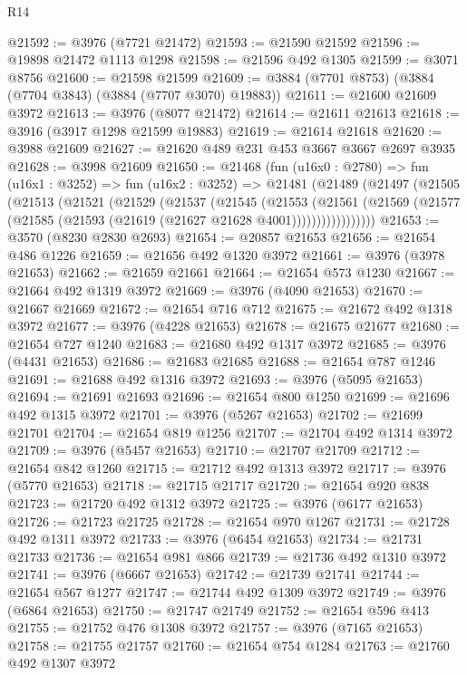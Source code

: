 \begin{lexlean}{R14}
\begin{coremodule}
@21592 := @3976 (@7721 @21472)
@21593 := @21590 @21592
@21596 := @19898 @21472 @1113 @1298
@21598 := @21596 @492 @1305
@21599 := @3071 @8756
@21600 := @21598 @21599
@21609 := @3884 (@7701 @8753) (@3884 (@7704 @3843) (@3884 (@7707 @3070) @19883))
@21611 := @21600 @21609 @3972
@21613 := @3976 (@8077 @21472)
@21614 := @21611 @21613
@21618 := @3916 (@3917 @1298 @21599 @19883)
@21619 := @21614 @21618
@21620 := @3988 @21609
@21627 := @21620 @489 @231 @453 @3667 @3667 @2697 @3935
@21628 := @3998 @21609
@21650 := @21468
    (fun (u16x0 : @2780) =>
    fun (u16x1 : @3252) =>
    fun (u16x2 : @3252) =>
    @21481
      (@21489
        (@21497
          (@21505
            (@21513
              (@21521
                (@21529
                  (@21537
                    (@21545
                      (@21553
                        (@21561
                          (@21569
                            (@21577 (@21585 (@21593 (@21619 (@21627 @21628 @4001)))))))))))))))))
@21653 := @3570 (@8230 @2830 @2693)
@21654 := @20857 @21653
@21656 := @21654 @486 @1226
@21659 := @21656 @492 @1320 @3972
@21661 := @3976 (@3978 @21653)
@21662 := @21659 @21661
@21664 := @21654 @573 @1230
@21667 := @21664 @492 @1319 @3972
@21669 := @3976 (@4090 @21653)
@21670 := @21667 @21669
@21672 := @21654 @716 @712
@21675 := @21672 @492 @1318 @3972
@21677 := @3976 (@4228 @21653)
@21678 := @21675 @21677
@21680 := @21654 @727 @1240
@21683 := @21680 @492 @1317 @3972
@21685 := @3976 (@4431 @21653)
@21686 := @21683 @21685
@21688 := @21654 @787 @1246
@21691 := @21688 @492 @1316 @3972
@21693 := @3976 (@5095 @21653)
@21694 := @21691 @21693
@21696 := @21654 @800 @1250
@21699 := @21696 @492 @1315 @3972
@21701 := @3976 (@5267 @21653)
@21702 := @21699 @21701
@21704 := @21654 @819 @1256
@21707 := @21704 @492 @1314 @3972
@21709 := @3976 (@5457 @21653)
@21710 := @21707 @21709
@21712 := @21654 @842 @1260
@21715 := @21712 @492 @1313 @3972
@21717 := @3976 (@5770 @21653)
@21718 := @21715 @21717
@21720 := @21654 @920 @838
@21723 := @21720 @492 @1312 @3972
@21725 := @3976 (@6177 @21653)
@21726 := @21723 @21725
@21728 := @21654 @970 @1267
@21731 := @21728 @492 @1311 @3972
@21733 := @3976 (@6454 @21653)
@21734 := @21731 @21733
@21736 := @21654 @981 @866
@21739 := @21736 @492 @1310 @3972
@21741 := @3976 (@6667 @21653)
@21742 := @21739 @21741
@21744 := @21654 @567 @1277
@21747 := @21744 @492 @1309 @3972
@21749 := @3976 (@6864 @21653)
@21750 := @21747 @21749
@21752 := @21654 @596 @413
@21755 := @21752 @476 @1308 @3972
@21757 := @3976 (@7165 @21653)
@21758 := @21755 @21757
@21760 := @21654 @754 @1284
@21763 := @21760 @492 @1307 @3972

\end{coremodule}
\end{lexlean}
